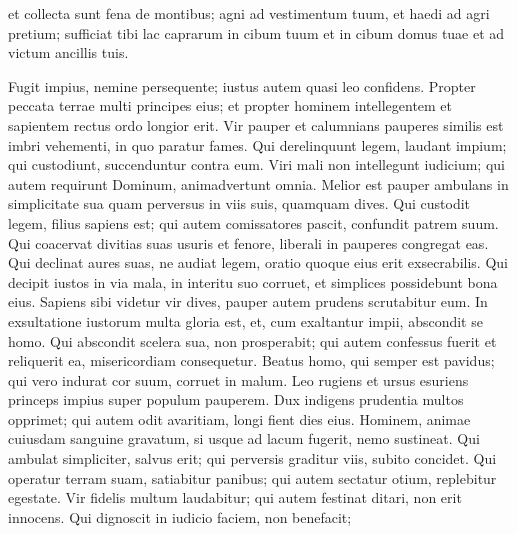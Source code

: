\begin{biblechapter}
\begin{biblechapter}
\begin{biblechapter}
\begin{biblechapter}
\begin{biblechapter}
\begin{biblechapter}
\begin{biblechapter}
\begin{biblechapter}
\begin{biblechapter}
\begin{biblechapter}
\begin{biblechapter}
\begin{biblechapter}
\begin{biblechapter}
\begin{biblechapter}
\begin{biblechapter}
\begin{biblechapter}
\begin{biblechapter}
\begin{biblechapter}
\begin{biblechapter}
\begin{biblechapter}
\begin{biblechapter}
\begin{biblechapter}
\begin{biblechapter}
\begin{biblechapter}
\begin{biblechapter}
\begin{biblechapter}
\begin{biblechapter}
 et collecta sunt fena de montibus;
 \verse agni ad vestimentum tuum,
 et haedi ad agri pretium;
 \verse sufficiat tibi lac caprarum in cibum tuum
 et in cibum domus tuae et ad victum ancillis tuis.
 
\begin{biblechapter}
 \verse Fugit impius, nemine persequente;
 iustus autem quasi leo confidens.
 \verse Propter peccata terrae multi principes eius;
 et propter hominem intellegentem et sapientem
 rectus ordo longior erit.
 \verse Vir pauper et calumnians pauperes
 similis est imbri vehementi, in quo paratur fames.
 \verse Qui derelinquunt legem, laudant impium;
 qui custodiunt, succenduntur contra eum.
 \verse Viri mali non intellegunt iudicium;
 qui autem requirunt Dominum, animadvertunt omnia.
 \verse Melior est pauper ambulans in simplicitate sua
 quam perversus in viis suis, quamquam dives.
 \verse Qui custodit legem, filius sapiens est;
 qui autem comissatores pascit, confundit patrem suum.
 \verse Qui coacervat divitias suas usuris et fenore,
 liberali in pauperes congregat eas.
 \verse Qui declinat aures suas, ne audiat legem,
 oratio quoque eius erit exsecrabilis.
 \verse Qui decipit iustos in via mala, in interitu suo corruet,
 et simplices possidebunt bona eius.
 \verse Sapiens sibi videtur vir dives,
 pauper autem prudens scrutabitur eum.
 \verse In exsultatione iustorum multa gloria est,
 et, cum exaltantur impii, abscondit se homo.
 \verse Qui abscondit scelera sua, non prosperabit;
 qui autem confessus fuerit et reliquerit ea,
 misericordiam consequetur.
 \verse Beatus homo, qui semper est pavidus;
 qui vero indurat cor suum, corruet in malum.
 \verse Leo rugiens et ursus esuriens
 princeps impius super populum pauperem.
 \verse Dux indigens prudentia multos opprimet;
 qui autem odit avaritiam, longi fient dies eius.
 \verse Hominem, animae cuiusdam sanguine gravatum,
 si usque ad lacum fugerit, nemo sustineat.
 \verse Qui ambulat simpliciter, salvus erit;
 qui perversis graditur viis, subito concidet.
 \verse Qui operatur terram suam, satiabitur panibus;
 qui autem sectatur otium, replebitur egestate.
 \verse Vir fidelis multum laudabitur;
 qui autem festinat ditari, non erit innocens.
 \verse Qui dignoscit in iudicio faciem, non benefacit;

\end{biblechapter}
\end{biblechapter}
\end{biblechapter}
\end{biblechapter}
\end{biblechapter}
\end{biblechapter}
\end{biblechapter}
\end{biblechapter}
\end{biblechapter}
\end{biblechapter}
\end{biblechapter}
\end{biblechapter}
\end{biblechapter}
\end{biblechapter}
\end{biblechapter}
\end{biblechapter}
\end{biblechapter}
\end{biblechapter}
\end{biblechapter}
\end{biblechapter}
\end{biblechapter}
\end{biblechapter}
\end{biblechapter}
\end{biblechapter}
\end{biblechapter}
\end{biblechapter}
\end{biblechapter}
\end{biblechapter}
